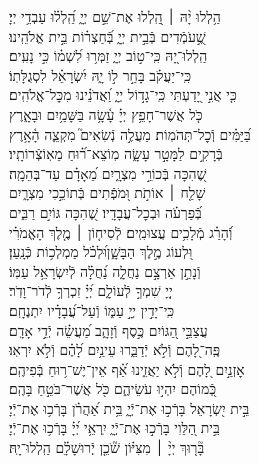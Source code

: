\documentclass[twoside, openany, parskip=half, 11pt]{book}
\begin{document}
\begin{narrow}
הַ֥לְלוּ יָ֨הּ ׀ \hfill \break
הַֽ֭לְלוּ אֶת־שֵׁ֣ם יְיָ֑ \hfill הַֽ֝לְל֗וּ עַבְדֵ֥י יְיָ׃ \\
שֶׁ֣֭עֹמְֿדִים בְּֿבֵ֣ית יְיָ֑ \hfill בְּֿ֝חַצְר֗וֹת בֵּ֣ית אֱלֹהֵֽינוּ׃ \\
הַֽלְלוּ־יָ֭הּ כִּֽי־ט֣וֹב יְיָ֑ \hfill זַמְּר֥וּ לִ֝שְׁמ֗וֹ כִּ֣י נָעִֽים׃ \\
כִּֽי־יַעֲקֹ֗ב בָּחַ֣ר ל֣וֹ יָ֑הּ \hfill יִ֝שְׂרָאֵ֗ל לִסְגֻלָּתֽוֹ׃ \\
כִּ֤י אֲנִ֣י יָ֭דַעְתִּי כִּֽי־גָד֣וֹל יְיָ֑ \hfill וַ֝אֲדֹנֵ֗ינוּ מִכׇּל־אֱלֹהִֽים׃ \\
כֹּ֤ל אֲשֶׁר־חָפֵ֥ץ יְיָ֗ עָ֫שָׂ֥ה \hfill בַּשָּׁמַ֥יִם וּבָאָ֑רֶץ\\ בַּ֝יַּמִּ֗ים וְֿכׇל־תְּהֹמֽוֹת׃ \hfill
מַעֲלֶ֣ה נְֿשִׂאִים֮ מִקְצֵ֢ה הָ֫אָ֥רֶץ\\ בְּֿרָקִ֣ים לַמָּטָ֣ר עָשָׂ֑ה \hfill מֽוֹצֵא־ר֗֝וּחַ מֵאֽוֹצְֿרוֹתָֽיו׃ \\
שֶׁ֭הִכָּה בְּֿכוֹרֵ֣י מִצְרָ֑יִם \hfill מֵ֝אָדָ֗ם עַד־בְּהֵמָֽה׃ \\
שָׁלַ֤ח ׀ אוֹתֹ֣ת וּ֭מֹפְֿתִים \hfill בְּֿתוֹכֵ֣כִי מִצְרָ֑יִם\\ בְּֿ֝פַרְעֹ֗ה וּבְכׇל־עֲבָדָֽיו׃ \hfill
שֶׁ֭הִכָּה גּוֹיִ֣ם רַבִּ֑ים\\ וְֿ֝הָרַ֗ג מְֿלָכִ֥ים עֲצוּמִֽים׃ \hfill
לְֿסִיח֤וֹן ׀ מֶ֤לֶךְ הָאֱמֹרִ֗י\\ וּ֭לְעוֹג מֶ֣לֶךְ הַבָּשָׁ֑ן\hfill וּ֝לְכֹ֗ל מַמְלְכ֥וֹת כְּֿנָֽעַן׃ \\
וְֿנָתַ֣ן אַרְצָ֣ם נַחֲלָ֑ה \hfill נַ֝חֲלָ֗ה לְֿיִשְׂרָאֵ֥ל עַמּֽוֹ׃ \\
יְיָ֭ שִׁמְךָ֣ לְֿעוֹלָ֑ם \hfill יְ֝יָ֗ זִכְרְךָ֥ לְֿדֹר־וָדֹֽר׃ \\
כִּֽי־יָדִ֣ין יְיָ֣ עַמּ֑וֹ \hfill וְֿעַל־עֲ֝בָדָ֗יו יִתְנֶחָֽם׃ \\
עֲצַבֵּ֣י הַ֭גּוֹיִם כֶּ֣סֶף וְֿזָהָ֑ב \hfill מַ֝עֲשֵׂ֗ה יְֿדֵ֣י אָדָֽם׃ \\
פֶּֽה־לָ֭הֶם וְֿלֹ֣א יְֿדַבֵּ֑רוּ \hfill עֵינַ֥יִם לָ֝הֶ֗ם וְֿלֹ֣א יִרְאֽוּ׃ \\
אׇזְנַ֣יִם לָ֭הֶם וְֿלֹ֣א יַאֲזִ֑ינוּ \hfill אַ֗֝ף אֵין־יֶשׁ־ר֥וּחַ בְּֿפִיהֶֽם׃ \\
כְּֿ֭מוֹהֶם יִהְי֣וּ עֹשֵׂיהֶ֑ם \hfill כֹּ֖ל אֲשֶׁר־בֹּטֵ֣חַ בָּהֶֽם׃ \\
בֵּ֣ית יִ֭שְׂרָאֵל בָּרְֿכ֣וּ אֶת־יְֿיָ֑ \hfill בֵּ֥ית אַ֝הֲרֹ֗ן בָּרְֿכ֥וּ אֶת־יְֿיָ׃ \\
בֵּ֣ית הַ֭לֵּוִי בָּרְֿכ֣וּ אֶת־יְֿיָ֑ \hfill יִֽרְאֵ֥י יְ֝יָ֗ בָּרְֿכ֥וּ אֶת־יְֿיָ׃ \\
בָּ֘ר֤וּךְ יְיָ֨ ׀ מִצִּיּ֗וֹן שֹׁ֘כֵ֤ן יְֽֿרוּשָׁלָ֗‍ִם \hfill הַֽלְלוּ־יָֽהּ׃ \\



\end{narrow}
\end{document}
